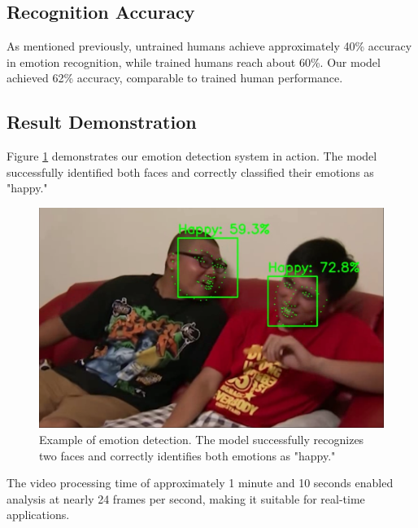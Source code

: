 \subsection{Recognition Accuracy}
As mentioned previously, untrained humans achieve approximately 40\% accuracy in emotion recognition, while trained humans reach about 60\%. Our model achieved 62\% accuracy, comparable to trained human performance.

\subsection{Result Demonstration}
Figure \ref{fig:jg_exp} demonstrates our emotion detection system in action. The model successfully identified both faces and correctly classified their emotions as "happy."

\begin{figure}[!htb]
	\centering
	 \includegraphics[width=0.6\linewidth]{assets/jg_exp.png}
	 \caption{Example of emotion detection. The model successfully recognizes two faces and correctly identifies both emotions as "happy."}
	 \label{fig:jg_exp}
\end{figure}

The video processing time of approximately 1 minute and 10 seconds enabled analysis at nearly 24 frames per second, making it suitable for real-time applications.
